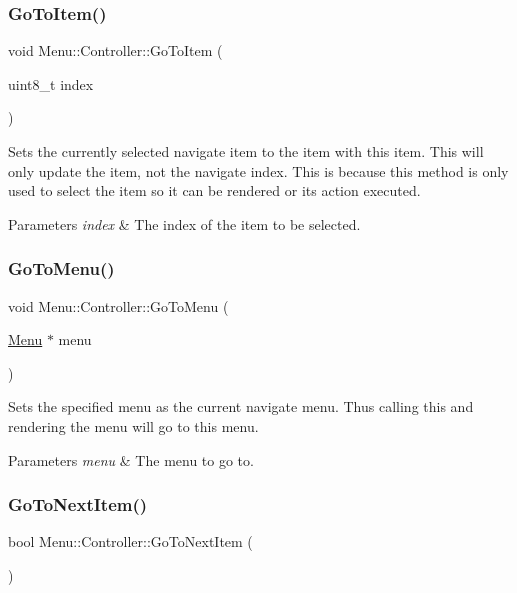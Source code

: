 \subsubsection{\texorpdfstring{Go\+To\+Item()}{GoToItem()}}
{\footnotesize\ttfamily void Menu\+::\+Controller\+::\+Go\+To\+Item (\begin{DoxyParamCaption}\item[{uint8\+\_\+t}]{index }\end{DoxyParamCaption})\hspace{0.3cm}{\ttfamily [private]}}

Sets the currently selected navigate item to the item with this item. This will only update the item, not the navigate index. This is because this method is only used to select the item so it can be rendered or its action executed. 
\begin{DoxyParams}{Parameters}
{\em index} & The index of the item to be selected. \\
\hline
\end{DoxyParams}
\hypertarget{class_menu_1_1_controller_a1df8e49520c77372d479903c3ec93341}{}\label{class_menu_1_1_controller_a1df8e49520c77372d479903c3ec93341} 
\subsubsection{\texorpdfstring{Go\+To\+Menu()}{GoToMenu()}}
{\footnotesize\ttfamily void Menu\+::\+Controller\+::\+Go\+To\+Menu (\begin{DoxyParamCaption}\item[{\hyperlink{struct_menu_1_1_menu}{Menu} $\ast$}]{menu }\end{DoxyParamCaption})}

Sets the specified menu as the current navigate menu. Thus calling this and rendering the menu will go to this menu. 
\begin{DoxyParams}{Parameters}
{\em menu} & The menu to go to. \\
\hline
\end{DoxyParams}
\hypertarget{class_menu_1_1_controller_ad93989bb6a9ed55f67ad5c15e666cf39}{}\label{class_menu_1_1_controller_ad93989bb6a9ed55f67ad5c15e666cf39} 
\subsubsection{\texorpdfstring{Go\+To\+Next\+Item()}{GoToNextItem()}}
{\footnotesize\ttfamily bool Menu\+::\+Controller\+::\+Go\+To\+Next\+Item (\begin{DoxyParamCaption}{ }\end{DoxyParamCaption})\hspace{0.3cm}{\ttfamily [private]}}

